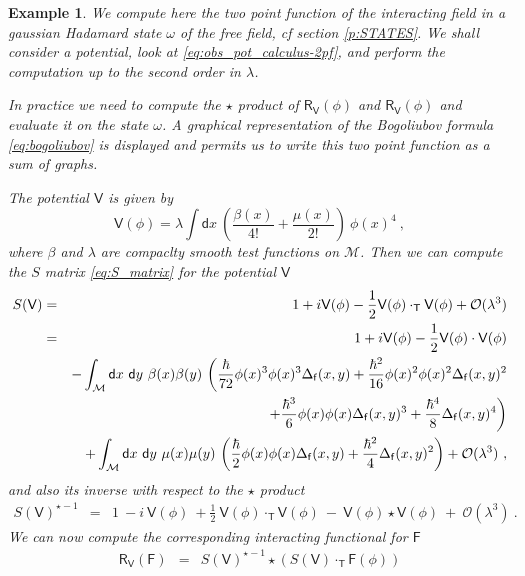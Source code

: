 \documentclass[11pt]{book}
\newcommand{\Mcal}{\mathcal{M}}
\newcommand{\Ocal}{\mathcal{O}}
\newcommand{\Fsf}{\mathsf{F}}
\newcommand{\Rsf}{\mathsf{R}}
\newcommand{\Tsf}{\mathsf{T}}
\newcommand{\Vsf}{\mathsf{V}}
\newcommand{\dsf}{\mathsf{d}}
\newcommand{\fsf}{\mathsf{f}}
\theoremstyle{break}
\newtheorem{example}{Example}[chapter]
\begin{document}
\begin{example}
We compute here the two point function of the interacting field in a gaussian Hadamard state $\omega$ of the free field, cf section \ref{p:STATES}. We shall consider a potential, look at \eqref{eq:obs_pot_calculus-2pf}, and perform the computation up to the second order in $\lambda$. \par
%
%
In practice we need to compute the $\star$ product of $\Rsf_\Vsf(\phi)$ and $\Rsf_\Vsf(\phi)$ and evaluate it on the state $\omega$. A graphical representation of the Bogoliubov formula \eqref{eq:bogoliubov} is displayed and permits us to write this two point function as a sum of graphs.\par
%
%
The potential $\Vsf$ is given by
%
\begin{equation}
\Vsf(\phi) = \lambda \int \dsf x \ \left( \frac{\beta(x)}{4!} + \frac{\mu(x)}{2!} \right) \ \phi(x)^4 \ ,
\label{eq:obs_pot_calculus-2pf}
\end{equation}
%
where $\beta$ and $\lambda$ are compaclty smooth test functions on $\Mcal$. Then we can compute the $S$ matrix \eqref{eq:S_matrix} for the potential $\Vsf$
%
\begin{eqnarray*}
S(\Vsf) &=& 1 + i \Vsf(\phi) - \frac{1}{2} \Vsf(\phi) \cdot_\Tsf \Vsf(\phi) + \Ocal(\lambda^3) \\
&=&  \ 1 + i \Vsf(\phi) - \frac{1}{2} \Vsf(\phi) \cdot \Vsf(\phi) \\
&& - \int_\Mcal \dsf x \ \dsf y \ \beta(x) \beta(y) \ \bigg( 
\frac{\hbar}{72} \phi(x)^3 \phi(x)^3 \Delta_\fsf(x,y) + \frac{\hbar^2}{16} \phi(x)^2 \phi(x)^2 \Delta_\fsf(x,y)^2 \\ 
&& \hspace*{13pt} + \frac{\hbar^3}{6} \phi(x) \phi(x) \Delta_\fsf(x,y)^3 + \frac{\hbar^4}{8} \Delta_\fsf(x,y)^4 \bigg) \\
&& + \int_\Mcal \dsf x \ \dsf y \ \mu(x) \mu(y) \ \bigg( 
\frac{\hbar}{2} \phi(x) \phi(x) \Delta_\fsf(x,y) + \frac{\hbar^2}{4} \Delta_\fsf(x,y)^2 \bigg) + \Ocal(\lambda^3) \ , 
\end{eqnarray*}
%
and also its inverse with respect to the $\star$ product
%
\begin{eqnarray*}
S(\Vsf)^{\star -1} &=& 1 \ - i \ \Vsf(\phi) \ + \frac{1}{2} \ \Vsf(\phi) \cdot_\Tsf \Vsf(\phi) \ - \ \Vsf(\phi) \star \Vsf(\phi) \ + \ \Ocal(\lambda^3) \ .
\end{eqnarray*}
%
We can now compute the corresponding interacting functional for $\Fsf$
%
\begin{eqnarray*}
\Rsf_\Vsf(\Fsf) &=& S(\Vsf)^{\star -1} \star \left( S(\Vsf) \cdot_\Tsf \Fsf(\phi) \right) \\

\end{eqnarray*}
\end{example}
\end{document}
